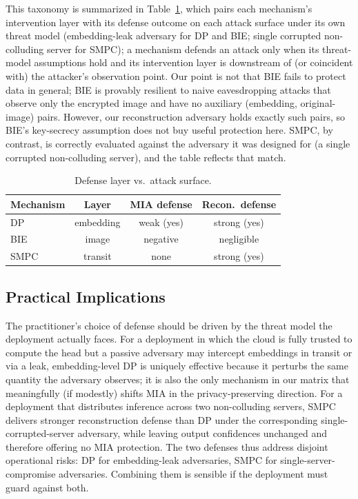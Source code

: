 \documentclass[conference]{IEEEtran}
\begin{document}
This taxonomy is summarized in Table~\ref{tab:mismatch}, which pairs each mechanism's intervention layer with its defense outcome on each attack surface under its own threat model (embedding-leak adversary for DP and BIE; single corrupted non-colluding server for SMPC); a mechanism defends an attack only when its threat-model assumptions hold and its intervention layer is downstream of (or coincident with) the attacker's observation point. Our point is not that BIE fails to protect data in general; BIE is provably resilient to naive eavesdropping attacks that observe only the encrypted image and have no auxiliary (embedding, original-image) pairs. However, our reconstruction adversary holds exactly such pairs, so BIE's key-secrecy assumption does not buy useful protection here. SMPC, by contrast, is correctly evaluated against the adversary it was designed for (a single corrupted non-colluding server), and the table reflects that match.

\begin{table}[htbp]
\caption{Defense layer vs.~attack surface.}
\label{tab:mismatch}
\centering
\renewcommand{\arraystretch}{1.2}
\begin{tabular}{lccc}
\toprule
\textbf{Mechanism} & \textbf{Layer} & \textbf{MIA defense} & \textbf{Recon.~defense} \\
\midrule
DP   & embedding & weak (yes)       & strong (yes)       \\
BIE  & image     & negative         & negligible         \\
SMPC & transit   & none             & strong (yes)       \\
\bottomrule
\end{tabular}
\end{table}

\subsection{Practical Implications}
The practitioner's choice of defense should be driven by the threat model the deployment actually faces. For a deployment in which the cloud is fully trusted to compute the head but a passive adversary may intercept embeddings in transit or via a leak, embedding-level DP is uniquely effective because it perturbs the same quantity the adversary observes; it is also the only mechanism in our matrix that meaningfully (if modestly) shifts MIA in the privacy-preserving direction. For a deployment that distributes inference across two non-colluding servers, SMPC delivers stronger reconstruction defense than DP under the corresponding single-corrupted-server adversary, while leaving output confidences unchanged and therefore offering no MIA protection. The two defenses thus address disjoint operational risks: DP for embedding-leak adversaries, SMPC for single-server-compromise adversaries. Combining them is sensible if the deployment must guard against both.
\end{document}
